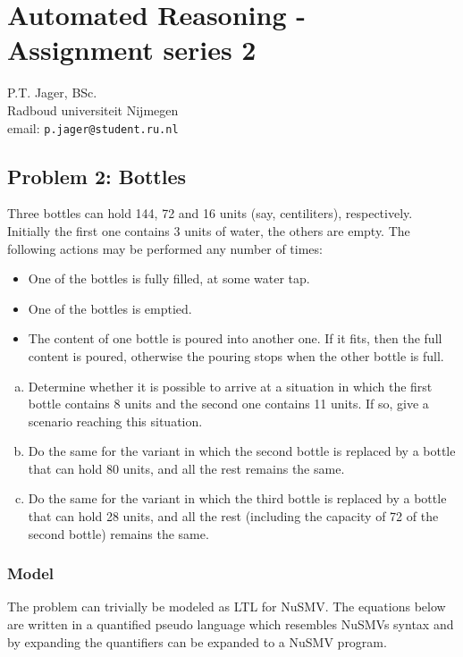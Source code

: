 \documentclass[12pt]{article}
\begin{document}
\section*{Automated Reasoning - Assignment series 2 }

\begin{center}
P.T. Jager, BSc. \\
Radboud universiteit Nijmegen\\
email: {\tt p.jager@student.ru.nl}
\end{center}

\subsection*{Problem 2: Bottles}

Three bottles can hold 144, 72 and 16 units (say, centiliters), respectively.
Initially the first one contains 3 units of water, the others are empty. 
The following actions may be performed any number of times:

\begin{itemize}
	\item One of the bottles is fully filled, at some water tap.
	\item One of the bottles is emptied.
	\item The content of one bottle is poured into another one. If it fits, 
			then the full content is poured, otherwise the pouring stops when 
			the other bottle is full.
\end{itemize}

\begin{enumerate}[(a)]
	\item Determine whether it is possible to arrive at a situation in which 
	the first bottle contains 8 units and the second one contains 11 units. If 
	so, give a scenario reaching this situation.
	\item Do the same for the variant in which the second bottle is replaced by 
	a bottle that can hold 80 units, and all the rest remains the same.
	\item Do the same for the variant in which the third bottle is replaced by a
	bottle that can hold 28 units, and all the rest (including the capacity of 
	72 of the second bottle) remains the same.
\end{enumerate}

\subsubsection*{Model}
The problem can trivially be modeled as LTL for NuSMV. The equations below are 
written in a quantified pseudo language which resembles NuSMVs syntax and by 
expanding the quantifiers can be expanded to a NuSMV program. 
\end{document}
